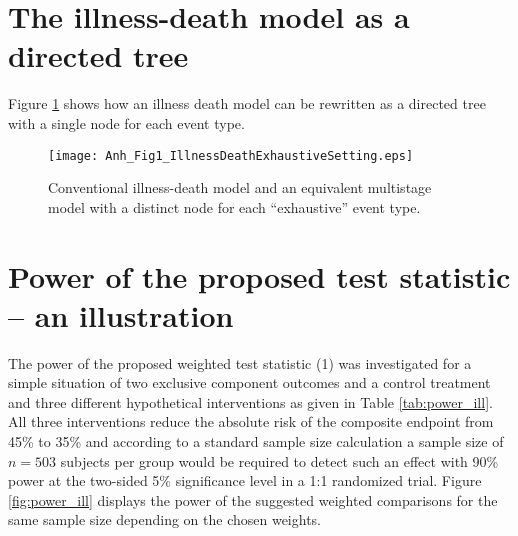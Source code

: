 \documentclass[times,doublespace]{simauth_amod}
\begin{document}

\title{}

\author{Anh Nguyen Duc and Marcel Wolbers\corrauth}

\address{Oxford University Clinical Research Unit, Wellcome Trust Major Overseas Programme,
	Ho Chi Minh City, Viet Nam.\\
	Centre for Tropical Medicine, Nuffield Department of
	Medicine, University of Oxford, Oxford, UK.}




\maketitle
\appendix

\section{The illness-death model as a directed tree}
Figure \ref{fig:Multi-state-model-for-CE-exhaustive-marginal} shows how an illness death model can be rewritten as a directed tree with a single node for each event type. 
\begin{figure}[H]
	\centering
	\texttt{[image: Anh\_Fig1\_IllnessDeathExhaustiveSetting.eps]}
	\caption{Conventional illness-death model and an equivalent multistage model with a distinct node for each ``exhaustive'' event type.}
	\label{fig:Multi-state-model-for-CE-exhaustive-marginal}
\end{figure}

\section{Power of the proposed test statistic -- an illustration}\label{sec:power}
The power of the proposed weighted test statistic (1) was investigated for a simple situation of two exclusive component outcomes and a control treatment and three different hypothetical interventions as given in Table \ref{tab:power_ill}. All three interventions reduce the absolute risk of the composite endpoint from 45\% to 35\% and according to a standard sample size calculation a sample size of $n=503$ subjects per group would be required to detect such an effect with 90\% power at the two-sided 5\% significance level in a 1:1 randomized trial. Figure \ref{fig:power_ill} displays the power of the suggested weighted comparisons for the same sample size depending on the chosen weights. 
\end{document}
